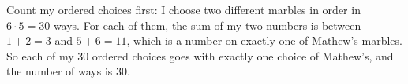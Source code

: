 Count my ordered choices first: I choose two different marbles in order in $6\cdot5=30$ ways. For each of them, the sum of my two numbers is between $1+2=3$ and $5+6=11$, which is a number on exactly one of Mathew's marbles. So each of my $30$ ordered choices goes with exactly one choice of Mathew's, and the number of ways is $\boxed{30}$.
